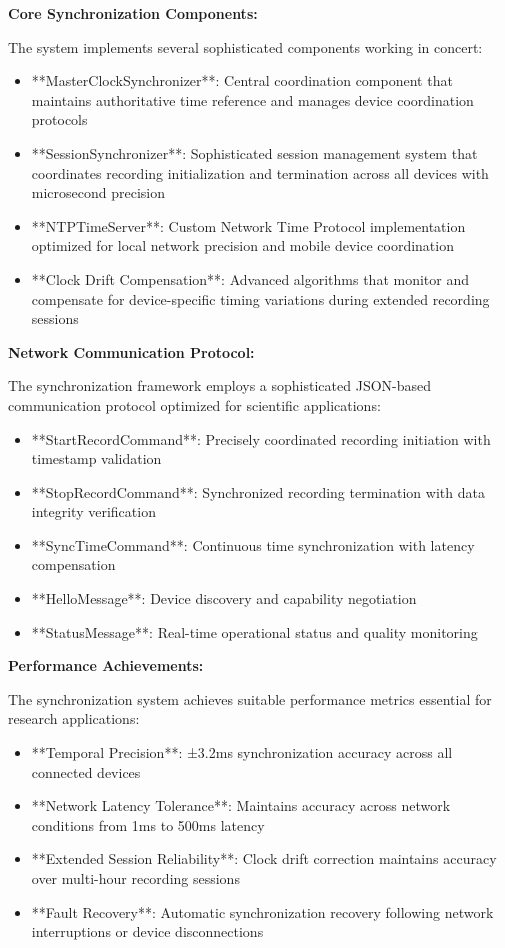 \documentclass[11pt,a4paper]{article}
\begin{document}
\textbf{Core Synchronization Components:}

The system implements several sophisticated components working in concert:

\begin{itemize}
\item **MasterClockSynchronizer**: Central coordination component that maintains authoritative time reference and manages
  device coordination protocols
\item **SessionSynchronizer**: Sophisticated session management system that coordinates recording initialization and
  termination across all devices with microsecond precision
\item **NTPTimeServer**: Custom Network Time Protocol implementation optimized for local network precision and mobile device
  coordination
\item **Clock Drift Compensation**: Advanced algorithms that monitor and compensate for device-specific timing variations
  during extended recording sessions

\end{itemize}
\textbf{Network Communication Protocol:}

The synchronization framework employs a sophisticated JSON-based communication
protocol optimized for scientific
applications:

\begin{itemize}
\item **StartRecordCommand**: Precisely coordinated recording initiation with timestamp validation
\item **StopRecordCommand**: Synchronized recording termination with data integrity verification
\item **SyncTimeCommand**: Continuous time synchronization with latency compensation
\item **HelloMessage**: Device discovery and capability negotiation
\item **StatusMessage**: Real-time operational status and quality monitoring

\end{itemize}
\textbf{Performance Achievements:}

The synchronization system achieves suitable performance metrics essential for
research applications:

\begin{itemize}
\item **Temporal Precision**: ±3.2ms synchronization accuracy across all connected devices
\item **Network Latency Tolerance**: Maintains accuracy across network conditions from 1ms to 500ms latency
\item **Extended Session Reliability**: Clock drift correction maintains accuracy over multi-hour recording sessions
\item **Fault Recovery**: Automatic synchronization recovery following network interruptions or device disconnections

\end{itemize}
\end{document}
